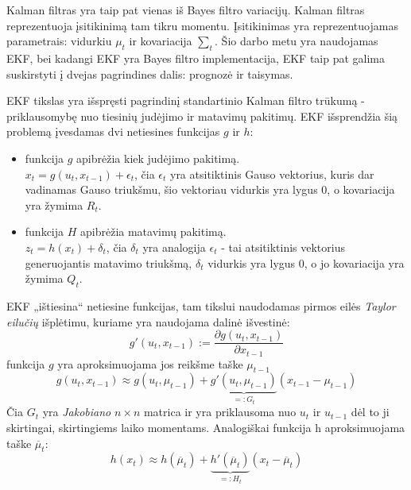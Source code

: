 \documentclass[a4paper,12pt]{article}
\begin{document}
		Kalman filtras yra taip pat vienas iš Bayes filtro variacijų. Kalman filtras reprezentuoja įsitikinimą tam tikru momentu. Įsitikinimas yra reprezentuojamas parametrais: vidurkiu $\mu_t$ ir kovariacija $\sum_t$. Šio darbo metu yra naudojamas \gls{EKF}, bei kadangi EKF yra Bayes filtro implementacija, EKF taip pat galima suskirstyti į dvejas pagrindines dalis: prognozė ir taisymas.
		
		EKF tikslas yra išspręsti pagrindinį standartinio Kalman filtro trūkumą - priklausomybę nuo tiesinių judėjimo ir matavimų pakitimų. EKF išsprendžia šią problemą įvesdamas dvi netiesines funkcijas $g$ ir $h$:
		\begin{itemize}
			\item funkcija $g$ apibrėžia kiek judėjimo pakitimą. \\ 
			$x_t = g(u_t, x_{t-1}) + \epsilon_t$, čia $\epsilon_t$ yra atsitiktinis Gauso vektorius, kuris dar vadinamas Gauso triukšmu, šio vektoriau vidurkis yra lygus 0, o kovariacija yra žymima $R_t$.
			
			\item funkcija $H$ apibrėžia matavimų pakitimą.\\
			$z_t = h(x_t) + \delta_t$, čia $\delta_t$ yra analogija $\epsilon_t$ - tai atsitiktinis vektorius generuojantis matavimo triukšmą, $\delta_t$ vidurkis yra lygus 0, o jo kovariacija yra žymima $Q_t$.
		\end{itemize}
		
		EKF „ištiesina“ netiesine funkcijas, tam tikslui naudodamas pirmos eilės \textit{Taylor eilučių} išplėtimu, kuriame yra naudojama dalinė išvestinė:
		\begin{equation}
			g'(u_t,x_{t-1}) := \frac{\partial g(u_t,x_{t-1})}{\partial x_{t-1}}
		\end{equation} 
		funkcija $g$ yra aproksimuojama jos reikšme taške $\mu_{t-1}$
		\begin{equation}
			g(u_t,x_{t-1}) \approx g(u_t, \mu_{t-1})  + \underset{=:G_t}{\underbrace{g'(u_t,\mu_{t-1})}}(x_{t-1} - \mu_{t-1})
		\end{equation} 
		Čia $G_t$ yra \textit{Jakobiano} $n \times n$ matrica ir yra priklausoma nuo $u_t$ ir $u_{t-1}$ dėl to ji skirtingai, skirtingiems laiko momentams. Analogiškai funkcija h aproksimuojama taške $\overline{\mu}_t$:
		\begin{equation}
			h(x_t) \approx h(\overline{\mu}_t)  + \underset{=:H_t}{\underbrace{h'(\overline{\mu}_t)}}(x_t - \overline{\mu}_t)
		\end{equation} 
		
\end{document}
